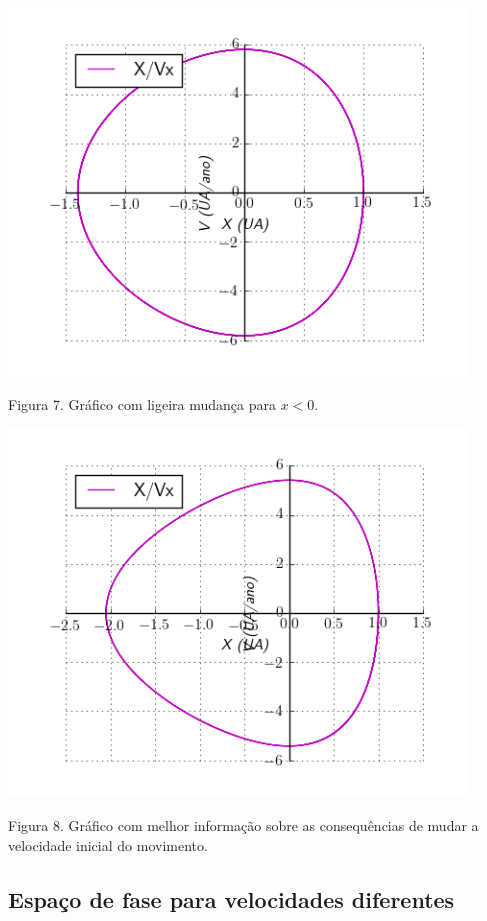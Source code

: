\documentclass[a4paper]{article} %
\begin{document}
\begin{center}
	\includegraphics[width=4.80in,height=3.84in, keepaspectratio=false]{image3_15-51-12-345000.png}
	
	\scriptsize {Figura 7. Gráfico com ligeira mudança para $x<0$.}
\end{center}

\begin{center}
	\includegraphics[width=4.80in,height=3.84in, keepaspectratio=false]{image4_15-51-08-565000.png}
	
	\scriptsize {Figura 8. Gráfico com melhor informação sobre as consequências de mudar a velocidade inicial do movimento.}
\end{center}

\subsection{Espaço de fase para velocidades diferentes}
\end{document}
